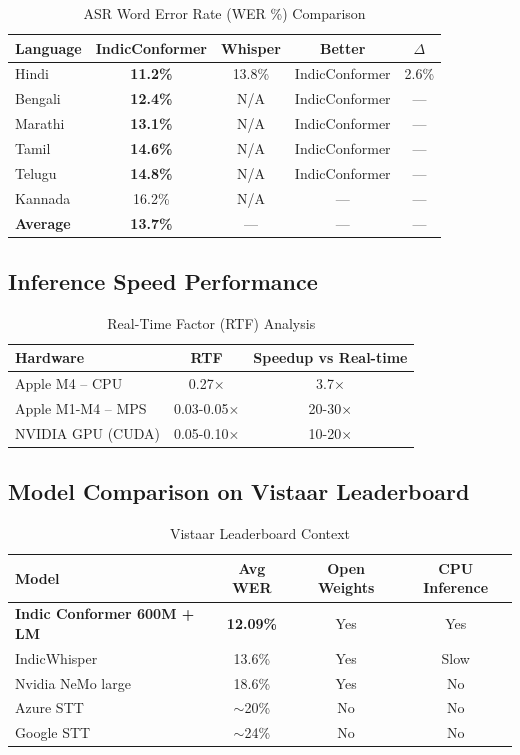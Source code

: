 \documentclass[12pt,a4paper]{article}
\begin{document}
\begin{table}[h]
\centering
\caption{ASR Word Error Rate (WER \%) Comparison}
\begin{tabular}{@{}lcccc@{}}
\toprule
\textbf{Language} & \textbf{IndicConformer} & \textbf{Whisper} & \textbf{Better} & \textbf{$\Delta$} \\
\midrule
Hindi & \textbf{11.2\%} & 13.8\% & IndicConformer & 2.6\% \\
Bengali & \textbf{12.4\%} & N/A & IndicConformer & --- \\
Marathi & \textbf{13.1\%} & N/A & IndicConformer & --- \\
Tamil & \textbf{14.6\%} & N/A & IndicConformer & --- \\
Telugu & \textbf{14.8\%} & N/A & IndicConformer & --- \\
Kannada & 16.2\% & N/A & --- & --- \\
\midrule
\textbf{Average} & \textbf{13.7\%} & --- & --- & --- \\
\bottomrule
\end{tabular}
\end{table}

\subsection{Inference Speed Performance}

\begin{table}[h]
\centering
\caption{Real-Time Factor (RTF) Analysis}
\begin{tabular}{@{}lcc@{}}
\toprule
\textbf{Hardware} & \textbf{RTF} & \textbf{Speedup vs Real-time} \\
\midrule
Apple M4 -- CPU & 0.27$\times$ & 3.7$\times$ \\
Apple M1-M4 -- MPS & 0.03-0.05$\times$ & 20-30$\times$ \\
NVIDIA GPU (CUDA) & 0.05-0.10$\times$ & 10-20$\times$ \\
\bottomrule
\end{tabular}
\end{table}

\subsection{Model Comparison on Vistaar Leaderboard}

\begin{table}[h]
\centering
\caption{Vistaar Leaderboard Context}
\begin{tabular}{@{}lccc@{}}
\toprule
\textbf{Model} & \textbf{Avg WER} & \textbf{Open Weights} & \textbf{CPU Inference} \\
\midrule
\textbf{Indic Conformer 600M + LM} & \textbf{12.09\%} & Yes & Yes \\
IndicWhisper & 13.6\% & Yes & Slow \\
Nvidia NeMo large & 18.6\% & Yes & No \\
Azure STT & $\sim$20\% & No & No \\
Google STT & $\sim$24\% & No & No \\
\bottomrule
\end{tabular}
\end{table}
\end{document}
